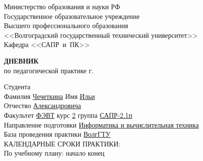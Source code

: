 \documentclass[a4paper, 14pt]{extreport}
\begin{document}
    \begin{titlepage}
        \begin{center}
            Министерство образования и науки РФ \\
            Государственное образовательное учреждение\\
            Высшего профессионального образования\\
            <<Волгоградский государственный технический университет>>\\
            Кафедра <<САПР~и~ПК>>
        \end{center}
        \vspace{2cm}
        \begin{center}
            \large \textbf{ДНЕВНИК} \\
            по педагогической практике \the\year г.
        \end{center}
        \begin{flushleft}
            Студента\\
            Фамилия \underline{Чечеткина\hspace{2.825cm}}
            Имя \underline{Ильи\hspace{2.7cm}}\\
            Отчество \underline{Александровича\hspace{1.5cm}}\\
            Факультет \underline{ФЭВТ\hspace{3.45cm}} курс \underline{2\hspace{1.5cm}} 
            группа \underline{САПР-2.1п\hspace{2.6cm}}\\
            \vspace{1cm}
            Направление подготовки \underline{Информатика и вычислительная техника\hspace{2.6cm}}\\
            \underline{\hspace{\textwidth}}
            База проведения практики \underline{ВолгГТУ\hspace{9.1cm}}\\
            \underline{\hspace{\textwidth}}\vspace{1cm}
            КАЛЕНДАРНЫЕ СРОКИ ПРАКТИКИ:\\
            По учебному плану: \hspace{0.2cm} начало \underline{\hspace{4.5cm}} 
            конец \underline{\hspace{4.5cm}}\\

\end{flushleft}
\end{titlepage}
\end{document}
